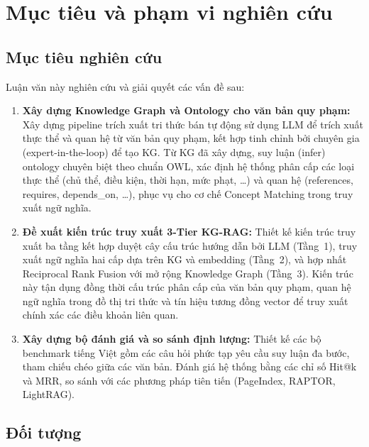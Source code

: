 \section{Mục tiêu và phạm vi nghiên cứu}
\label{sec:muctieu}

\subsection{Mục tiêu nghiên cứu}
\label{subsec:muctieu_nc}

Luận văn này nghiên cứu và giải quyết các vấn đề sau:
\begin{enumerate}
    \item \textbf{Xây dựng Knowledge Graph và Ontology cho văn bản quy phạm:} Xây dựng pipeline trích xuất tri thức bán tự động sử dụng LLM để trích xuất thực thể và quan hệ từ văn bản quy phạm, kết hợp tinh chỉnh bởi chuyên gia (expert-in-the-loop) để tạo KG. Từ KG đã xây dựng, suy luận (infer) ontology chuyên biệt theo chuẩn OWL, xác định hệ thống phân cấp các loại thực thể (chủ thể, điều kiện, thời hạn, mức phạt, \ldots) và quan hệ (references, requires, depends\_on, \ldots), phục vụ cho cơ chế Concept Matching trong truy xuất ngữ nghĩa.

    \item \textbf{Đề xuất kiến trúc truy xuất 3-Tier KG-RAG:} Thiết kế kiến trúc truy xuất ba tầng kết hợp duyệt cây cấu trúc hướng dẫn bởi LLM (Tầng~1), truy xuất ngữ nghĩa hai cấp dựa trên KG và embedding (Tầng~2), và hợp nhất Reciprocal Rank Fusion với mở rộng Knowledge Graph (Tầng~3). Kiến trúc này tận dụng đồng thời cấu trúc phân cấp của văn bản quy phạm, quan hệ ngữ nghĩa trong đồ thị tri thức và tín hiệu tương đồng vector để truy xuất chính xác các điều khoản liên quan.

    \item \textbf{Xây dựng bộ đánh giá và so sánh định lượng:} Thiết kế các bộ benchmark tiếng Việt gồm các câu hỏi phức tạp yêu cầu suy luận đa bước, tham chiếu chéo giữa các văn bản. Đánh giá hệ thống bằng các chỉ số Hit@k và MRR, so sánh với các phương pháp tiên tiến (PageIndex, RAPTOR, LightRAG).
\end{enumerate}

\subsection{Đối tượng}
\label{subsec:doituong}

